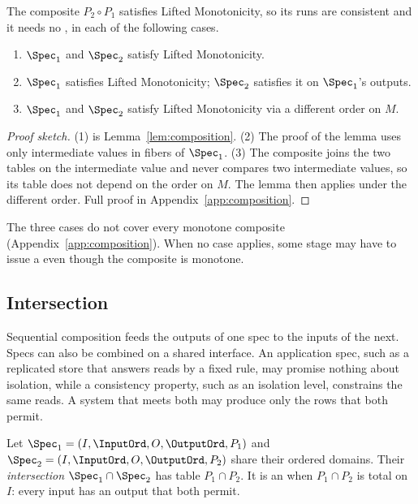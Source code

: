 \begin{proposition}
\label{prop:joint-monotone}
The composite $P_2\circ P_1$ satisfies Lifted Monotonicity, so its runs are
consistent and it needs no \commitment, in each of the following cases.
\begin{enumerate}
  \item $\Spec_1$ and $\Spec_2$ satisfy Lifted Monotonicity.
  \item $\Spec_1$ satisfies Lifted Monotonicity; $\Spec_2$ satisfies it on
        $\Spec_1$'s outputs.
  \item $\Spec_1$ and $\Spec_2$ satisfy Lifted Monotonicity via a different order
        on $M$.
\end{enumerate}
\end{proposition}

\begin{proof}[Proof sketch]
(1) is Lemma~\ref{lem:composition}.  (2) The proof of the lemma uses only
intermediate values in fibers of $\Spec_1$.  (3) The composite joins the two
tables on the intermediate value and never compares two intermediate values, so
its table does not depend on the order on $M$.  The lemma then applies under
the different order.  Full proof in Appendix~\ref{app:composition}.
\end{proof}

The three cases do not cover every monotone composite
(Appendix~\ref{app:composition}).  When no case applies, some stage may have to issue a \commitment even though the composite is monotone.

\subsection{Intersection}
\label{sec:intersection}

Sequential composition feeds the outputs of one spec to the inputs of the
next.  Specs can also be combined on a shared interface.  An application spec,
such as a replicated store that answers reads by a fixed rule, may promise
nothing about isolation, while a consistency property, such as an isolation
level, constrains the same reads.  A system that meets both may produce only
the rows that both permit.

\begin{definition}[Intersection]
\label{def:intersection}
Let $\Spec_1=(I,\InputOrd,O,\OutputOrd,P_1)$ and
$\Spec_2=(I,\InputOrd,O,\OutputOrd,P_2)$ share their ordered domains.  Their
\emph{intersection} $\Spec_1\cap\Spec_2$ has table $P_1\cap P_2$.  It is an
\spectype when $P_1\cap P_2$ is total on $I$: every input has an output that
both permit.
\end{definition}

